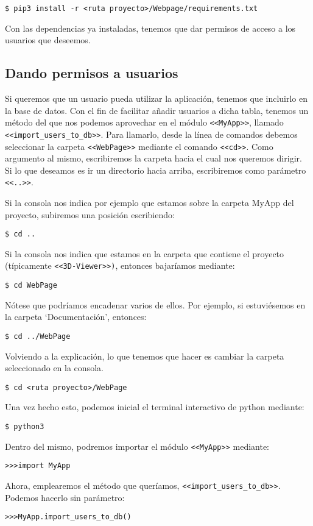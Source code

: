 \noindent\verb|$ pip3 install -r <ruta proyecto>/Webpage/requirements.txt|

Con las dependencias ya instaladas, tenemos que dar permisos de acceso a los usuarios que deseemos.

\subsection{Dando permisos a usuarios}
Si queremos que un usuario pueda utilizar la aplicación, tenemos que incluirlo en la base de datos. Con el fin de facilitar añadir usuarios a dicha tabla, tenemos un método del que nos podemos aprovechar en el módulo \texttt{<<MyApp>>}, llamado \texttt{<<import\_users\_to\_db>>}. Para llamarlo, desde la línea de comandos debemos seleccionar la carpeta \texttt{<<WebPage>>} mediante el comando \texttt{<<cd>>}. Como argumento al mismo, escribiremos la carpeta hacia el cual nos queremos dirigir. Si lo que deseamos es ir un directorio hacia arriba, escribiremos como parámetro \texttt{<<..>>}.

Si la consola nos indica por ejemplo que estamos sobre la carpeta MyApp del proyecto, subiremos una posición escribiendo:

\noindent\verb|$ cd ..|

Si la consola nos indica que estamos en la carpeta que contiene el proyecto (típicamente \texttt{<<3D-Viewer>>)}, entonces bajaríamos mediante:

\noindent\verb|$ cd WebPage|

Nótese que podríamos encadenar varios de ellos. Por ejemplo, si estuviésemos en la carpeta `Documentación', entonces:

\noindent\verb|$ cd ../WebPage|

Volviendo a la explicación, lo que tenemos que hacer es cambiar la carpeta seleccionado en la consola.

\noindent\verb|$ cd <ruta proyecto>/WebPage|

Una vez hecho esto, podemos inicial el terminal interactivo de python mediante:

\noindent\verb|$ python3|

Dentro del mismo, podremos importar el módulo \texttt{<<MyApp>>} mediante:

\noindent\verb|>>>import MyApp|

Ahora, emplearemos el método que queríamos, \texttt{<<import\_users\_to\_db>>}. Podemos hacerlo sin parámetro:

\noindent\verb|>>>MyApp.import_users_to_db()|

